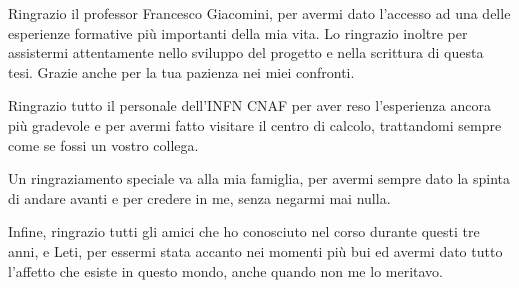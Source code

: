 \documentclass[12pt,a4paper,openright,twoside]{report}
\begin{document}
Ringrazio il professor Francesco Giacomini, per avermi dato l'accesso ad una delle esperienze formative più importanti della mia vita. Lo ringrazio 
inoltre per assistermi attentamente nello sviluppo del progetto e nella scrittura di questa tesi. Grazie anche per la tua pazienza nei miei confronti.  

Ringrazio tutto il personale dell'INFN CNAF per aver reso l'esperienza ancora più gradevole e per avermi fatto visitare il centro di calcolo, trattandomi sempre come se fossi un vostro collega.  

Un ringraziamento speciale va alla mia famiglia, per avermi sempre dato la spinta di andare avanti e per credere in me, senza negarmi mai nulla. 

Infine, ringrazio tutti gli amici che ho conosciuto nel corso durante questi tre anni, e Leti, per essermi stata accanto nei momenti più bui ed avermi dato tutto l'affetto che esiste in questo mondo, anche quando non me lo meritavo.  
\end{document}
